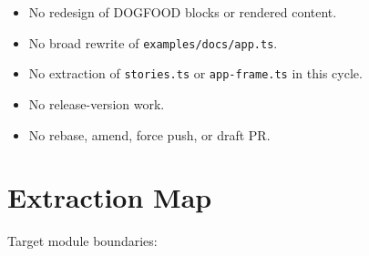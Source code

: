 \begin{itemize}
\tightlist
\item
  No redesign of DOGFOOD blocks or rendered content.
\item
  No broad rewrite of \texttt{e\allowbreak{}x\allowbreak{}a\allowbreak{}m\allowbreak{}p\allowbreak{}l\allowbreak{}e\allowbreak{}s\allowbreak{}/\allowbreak{}d\allowbreak{}o\allowbreak{}c\allowbreak{}s\allowbreak{}/\allowbreak{}a\allowbreak{}p\allowbreak{}p\allowbreak{}.\allowbreak{}t\allowbreak{}s}.
\item
  No extraction of \texttt{s\allowbreak{}t\allowbreak{}o\allowbreak{}r\allowbreak{}i\allowbreak{}e\allowbreak{}s\allowbreak{}.\allowbreak{}t\allowbreak{}s} or \texttt{a\allowbreak{}p\allowbreak{}p\allowbreak{}-\allowbreak{}f\allowbreak{}r\allowbreak{}a\allowbreak{}m\allowbreak{}e\allowbreak{}.\allowbreak{}t\allowbreak{}s} in this cycle.
\item
  No release-version work.
\item
  No rebase, amend, force push, or draft PR.
\end{itemize}

\section{Extraction Map}\label{record-253-extraction-map}

Target module boundaries:

